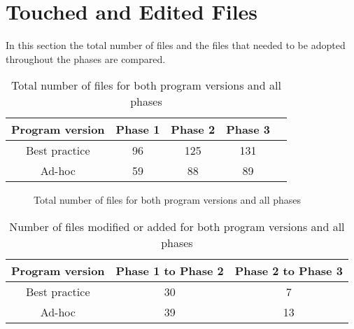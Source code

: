 \section{Touched and Edited Files}
\label{sec:file-count}
In this section the total number of files and the files that needed to be adopted throughout the phases are compared.

\begin{table}
	\centering
	\label{table:files}
	\begin{tabular}{|c|c|c|c|c|} \hline
		\textbf{Program version} &\textbf{Phase 1} & \textbf{Phase 2} & \textbf{Phase 3} \\ \hline
		Best practice & 96 & 125 & 131 \\ \hline
		Ad-hoc & 59 & 88 & 89 \\ \hline
	\end{tabular}
	\caption{Total number of files for both program versions and all phases}
\end{table}

\begin{figure}
	\centering
	\caption{Total number of files for both program versions and all phases}
\end{figure}

 \begin{table}
 	\centering
 	\label{table:touched-files}
 	\begin{tabular}{|c|c|c|} \hline
 		\textbf{Program version} &\textbf{Phase 1 to Phase 2} & \textbf{Phase 2 to Phase 3} \\ \hline
 		Best practice & 30 & 7 \\ \hline
 		Ad-hoc & 39 & 13\\ \hline
 	\end{tabular}
 	\caption{Number of files modified or added for both program versions and all phases}
 \end{table}

